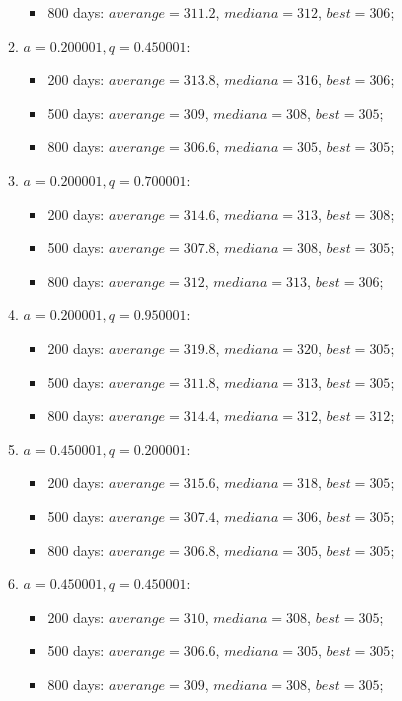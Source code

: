 \begin{enumerate}
\begin{enumerate}
\begin{itemize}
			\item 800 days: $averange = 311.2$, $mediana = 312$, $best = 306$;
		\end{itemize}
		\item $a= 0.200001, q= 0.450001$:
		\begin{itemize}
			\item 200 days: $averange = 313.8$, $mediana = 316$, $best = 306$;
			\item 500 days: $averange = 309$, $mediana = 308$, $best = 305$;
			\item 800 days: $averange = 306.6$, $mediana = 305$, $best = 305$;
		\end{itemize}
		\item $a= 0.200001, q= 0.700001$:
		\begin{itemize}
			\item 200 days: $averange = 314.6$, $mediana = 313$, $best = 308$;
			\item 500 days: $averange = 307.8$, $mediana = 308$, $best = 305$;
			\item 800 days: $averange = 312$, $mediana = 313$, $best = 306$;
		\end{itemize}
		\item $a= 0.200001, q= 0.950001$:
		\begin{itemize}
			\item 200 days: $averange = 319.8$, $mediana = 320$, $best = 305$;
			\item 500 days: $averange = 311.8$, $mediana = 313$, $best = 305$;
			\item 800 days: $averange = 314.4$, $mediana = 312$, $best = 312$;
		\end{itemize}
		\item $a= 0.450001, q= 0.200001$:
		\begin{itemize}
			\item 200 days: $averange = 315.6$, $mediana = 318$, $best = 305$;
			\item 500 days: $averange = 307.4$, $mediana = 306$, $best = 305$;
			\item 800 days: $averange = 306.8$, $mediana = 305$, $best = 305$;
		\end{itemize}
		\item $a= 0.450001, q= 0.450001$:
		\begin{itemize}
			\item 200 days: $averange = 310$, $mediana = 308$, $best = 305$;
			\item 500 days: $averange = 306.6$, $mediana = 305$, $best = 305$;
			\item 800 days: $averange = 309$, $mediana = 308$, $best = 305$;

\end{itemize}
\end{enumerate}
\end{enumerate}
